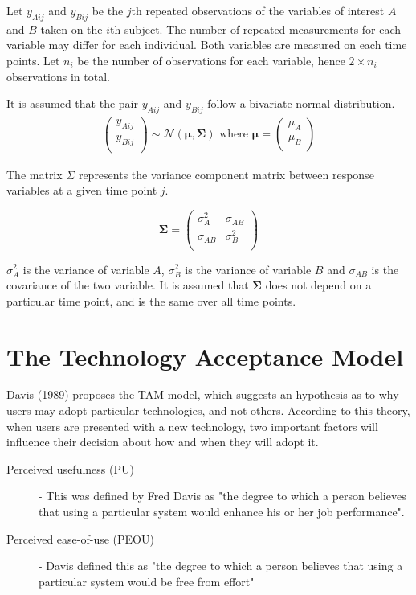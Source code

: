 \documentclass[12pt, a4paper]{report}
\theoremstyle{plain}
\theoremstyle{definition}
\theoremstyle{remark}
\begin{document}
	Let $y_{Aij}$ and $y_{Bij}$ be the $j$th repeated observations of the variables of interest $A$ and $B$ taken on the $i$th subject. The number of repeated measurements for each variable may differ for each individual.
	Both variables are measured on each time points. Let $n_{i}$ be the number of observations for each variable, hence $2\times n_{i}$ observations in total.
	
	It is assumed that the pair $y_{Aij}$ and $y_{Bij}$ follow a bivariate normal distribution.
	\begin{eqnarray*}
		\left(
		\begin{array}{c}
			y_{Aij} \\
			y_{Bij} \\
		\end{array}
		\right) \sim \mathcal{N}(
		\boldsymbol{\mu}, \boldsymbol{\Sigma})\mbox{   where } \boldsymbol{\mu} = \left(
		\begin{array}{c}
			\mu_{A} \\
			\mu_{B} \\
		\end{array}
		\right)
	\end{eqnarray*}
	
	The matrix $\Sigma$ represents the variance component matrix between response variables at a given time point $j$.
	
	\[
	\boldsymbol{\Sigma} = \left( \begin{array}{cc}
	\sigma^2_{A} & \sigma_{AB} \\
	\sigma_{AB} & \sigma^2_{B}\\
	\end{array}   \right)
	\]
	
	$\sigma^2_{A}$ is the variance of variable $A$, $\sigma^2_{B}$ is the variance of variable $B$ and $\sigma_{AB}$ is the covariance of the two variable. It is assumed that $\boldsymbol{\Sigma}$ does not depend on a particular time point, and is the same over all time points.
	
	
	
	\section{The Technology Acceptance Model}
	Davis (1989) proposes the TAM model, which suggests an hypothesis as to why users may adopt particular technologies, and not others. 
	According to this theory, when users are presented with a new 
	technology, two important factors will influence their decision about how and when they will adopt it.
	\begin{description}
		\item[Perceived usefulness (PU)] - This was defined by Fred Davis as "the degree to which a person believes that using a particular system would enhance his or her job performance".
		\item[Perceived ease-of-use (PEOU)] - Davis defined this as "the degree to which a person believes that using a particular system would be free from effort" 
	\end{description}
	
\end{document}
